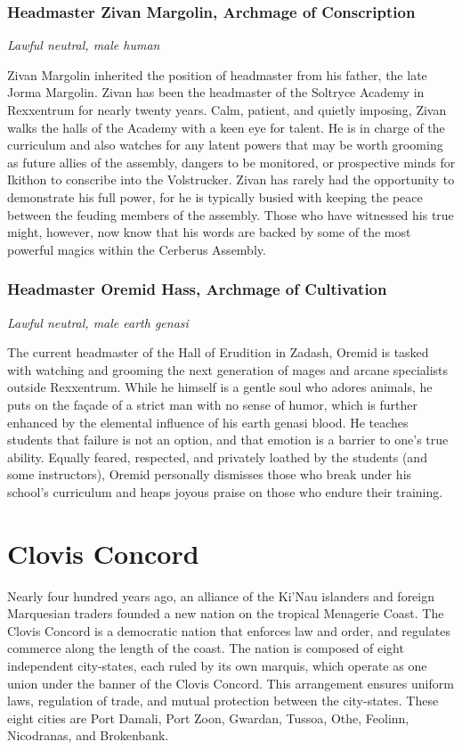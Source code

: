 \documentclass[10pt,a4paper,twoside,bg=print,twocolumn,openany,nodeprecatedcode]{dndbook}
\begin{document}
\subsubsection{Headmaster Zivan Margolin, Archmage of Conscription}
\textit{Lawful neutral, male human}

Zivan Margolin inherited the position of headmaster from his father, the late Jorma Margolin. Zivan has been the headmaster of the Soltryce Academy in Rexxentrum for nearly twenty years. Calm, patient, and quietly imposing, Zivan walks the halls of the Academy with a keen eye for talent. He is in charge of the curriculum and also watches for any latent powers that may be worth grooming as future allies of the assembly, dangers to be monitored, or prospective minds for Ikithon to conscribe into the Volstrucker. Zivan has rarely had the opportunity to demonstrate his full power, for he is typically busied with keeping the peace between the feuding members of the assembly. Those who have witnessed his true might, however, now know that his words are backed by some of the most powerful magics within the Cerberus Assembly.

\subsubsection{Headmaster Oremid Hass, Archmage of Cultivation}
\textit{Lawful neutral, male earth genasi}

The current headmaster of the Hall of Erudition in Zadash, Oremid is tasked with watching and grooming the next generation of mages and arcane specialists outside Rexxentrum. While he himself is a gentle soul who adores animals, he puts on the façade of a strict man with no sense of humor, which is further enhanced by the elemental influence of his earth genasi blood. He teaches students that failure is not an option, and that emotion is a barrier to one's true ability. Equally feared, respected, and privately loathed by the students (and some instructors), Oremid personally dismisses those who break under his school's curriculum and heaps joyous praise on those who endure their training.

\section{Clovis Concord}
Nearly four hundred years ago, an alliance of the Ki'Nau islanders and foreign Marquesian traders founded a new nation on the tropical Menagerie Coast. The Clovis Concord is a democratic nation that enforces law and order, and regulates commerce along the length of the coast. The nation is composed of eight independent city-states, each ruled by its own marquis, which operate as one union under the banner of the Clovis Concord. This arrangement ensures uniform laws, regulation of trade, and mutual protection between the city-states. These eight cities are Port Damali, Port Zoon, Gwardan, Tussoa, Othe, Feolinn, Nicodranas, and Brokenbank.
\end{document}

